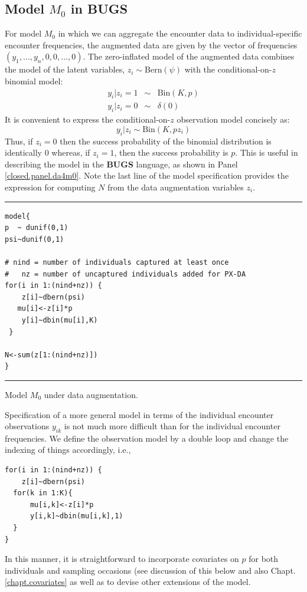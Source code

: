 \subsection{Model $M_0$ in BUGS}

For model $M_0$ in which we can aggregate the encounter data to
individual-specific encounter frequencies, the augmented data are
given by the vector of frequencies $(y_{1}, \ldots, y_{n}, 0, 0,
\ldots, 0)$. The zero-inflated model of the augmented data combines
the model of the latent variables, $z_{i} \sim \mbox{Bern}(\psi)$ with
the conditional-on-$z$ binomial model:
\begin{eqnarray*}
y_{i}|z_{i} = 1   &\sim& \mbox{Bin}(K,p) \\
y_{i} | z_{i} = 0 &\sim& \delta(0) 
\end{eqnarray*}
It is convenient to express the conditional-on-$z$ observation model concisely as:
\[
 y_{i}|z_{i} \sim \mbox{Bin}(K, p z_{i})
\]
Thus, if $z_{i}=0$ then the success probability of the binomial
distribution is identically 0 whereas, if $z_{i}=1$, then the success
probability is $p$. This is useful in describing the model in the {\bf
  BUGS}
language, as shown in Panel \ref{closed.panel.da4m0}.
 Note the last line of the model
specification  provides the expression for computing $N$ from the
data augmentation variables $z_{i}$.

\begin{panel}[htp]
\centering
\rule[0.15in]{\textwidth}{.03in}
{\small
\begin{verbatim}
model{
p  ~ dunif(0,1)
psi~dunif(0,1)

# nind = number of individuals captured at least once
#   nz = number of uncaptured individuals added for PX-DA
for(i in 1:(nind+nz)) {
    z[i]~dbern(psi)
   mu[i]<-z[i]*p
    y[i]~dbin(mu[i],K)
 }

N<-sum(z[1:(nind+nz)])
}
\end{verbatim}
}
\rule[-0.15in]{\textwidth}{.03in}
\caption{Model $M_{0}$ under data augmentation.}
\label{closed.panel.da4m0}
\end{panel}




Specification of a more general model in terms of the individual
encounter observations $y_{ik}$ is not much more difficult than for
the individual encounter frequencies.  We define the
observation model by a double loop and change the indexing of things
accordingly, i.e.,
{\small
\begin{verbatim}
for(i in 1:(nind+nz)) {
    z[i]~dbern(psi)
  for(k in 1:K){
      mu[i,k]<-z[i]*p
      y[i,k]~dbin(mu[i,k],1)
  }
}
\end{verbatim}
}
In this manner, it is straightforward to incorporate covariates on $p$ 
for both individuals and sampling occasions 
(see discussion of this below and also Chapt. \ref{chapt.covariates} 
as well as to devise other extensions of the model.

